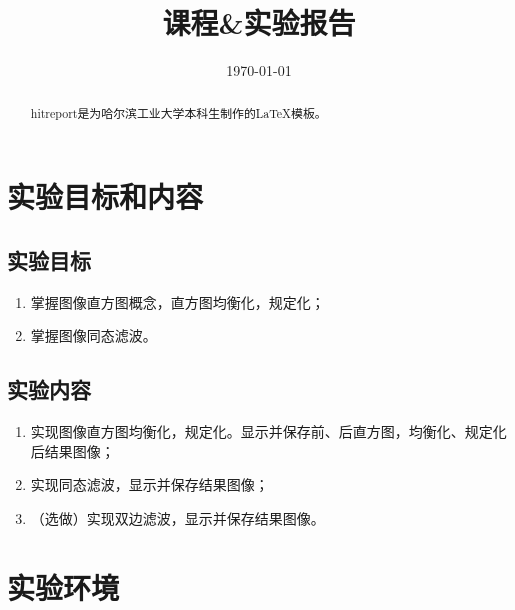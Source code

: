 \documentclass{hitreport}
\title{课程\&实验报告} %
\date{\today} %
\begin{document}

\maketitle
\begin{abstract}
hitreport是为哈尔滨工业大学本科生制作的\LaTeX 模板。

\end{abstract}

\tableofcontents
\newpage



\section{实验目标和内容}

\subsection{实验目标}
\begin{enumerate}
\item 掌握图像直方图概念，直方图均衡化，规定化；
\item 掌握图像同态滤波。
\end{enumerate}

\subsection{实验内容}
\begin{enumerate}
\item 实现图像直方图均衡化，规定化。显示并保存前、后直方图，均衡化、规定化后结果图像；
\item 实现同态滤波，显示并保存结果图像；
\item （选做）实现双边滤波，显示并保存结果图像。
\end{enumerate}

\section{实验环境}
\end{document}
